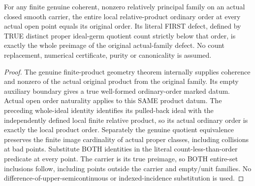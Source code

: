 \begin{theorem}
\label{hir:sharp-actual-family-distinct-defect-open}
\leanok
For any finite genuine coherent, nonzero relatively principal family on an
actual closed smooth carrier, the entire local relative-product ordinary order
at every actual open point equals its original order. Its literal FIRST defect,
defined by TRUE distinct proper ideal-germ quotient count strictly below that
order, is exactly the whole preimage of the original actual-family defect.
No count replacement, numerical certificate, purity or canonicality is assumed.
\end{theorem}
\begin{proof}
The genuine finite-product geometry theorem internally supplies coherence and
nonzero of the actual original product from the original family. Its empty
auxiliary boundary gives a true well-formed ordinary-order marked datum.
Actual open order naturality applies to this SAME product datum. The preceding
whole-ideal identity identifies its pulled-back ideal with the independently
defined local finite relative product, so its actual ordinary order is exactly
the local product order. Separately the genuine quotient equivalence preserves
the finite image cardinality of actual proper classes, including collisions
at bad points. Substitute BOTH identities in the literal count-less-than-order
predicate at every point. The carrier is its true preimage, so BOTH entire-set
inclusions follow, including points outside the carrier and empty/unit families.
No difference-of-upper-semicontinuous or indexed-incidence substitution is used.
\end{proof}

